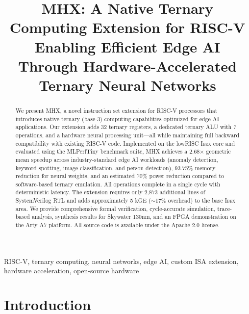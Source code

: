 \documentclass[conference,10pt]{IEEEtran}
\newcommand{\mhx}{\textsc{MHX\texttrademark}}
\newcommand{\ibex}{\textsc{Ibex}}
\newcommand{\riscv}{RISC-V}
\begin{document}
\title{MHX\texttrademark: A Native Ternary Computing Extension for RISC-V\\
\large Enabling Efficient Edge AI Through Hardware-Accelerated Ternary Neural Networks}

\author{
}
\maketitle

\begin{abstract}
We present \mhx{}, a novel instruction set extension for \riscv{} processors that introduces native ternary (base-3) computing capabilities optimized for edge AI applications. Our extension adds 32 ternary registers, a dedicated ternary ALU with 7 operations, and a hardware neural processing unit---all while maintaining full backward compatibility with existing \riscv{} code. Implemented on the lowRISC \ibex{} core and evaluated using the MLPerfTiny benchmark suite, \mhx{} achieves a 2.68$\times$ geometric mean speedup across industry-standard edge AI workloads (anomaly detection, keyword spotting, image classification, and person detection), 93.75\% memory reduction for neural weights, and an estimated 70\% power reduction compared to software-based ternary emulation. All operations complete in a single cycle with deterministic latency. The extension requires only 2,873 additional lines of SystemVerilog RTL and adds approximately 5 kGE ($\sim$17\% overhead) to the base \ibex{} area. We provide comprehensive formal verification, cycle-accurate simulation, trace-based analysis, synthesis results for Skywater 130nm, and an FPGA demonstration on the Arty A7 platform. All source code is available under the Apache 2.0 license.
\end{abstract}

\begin{IEEEkeywords}
RISC-V, ternary computing, neural networks, edge AI, custom ISA extension, hardware acceleration, open-source hardware
\end{IEEEkeywords}

\section{Introduction}
\label{sec:introduction}
\end{document}
